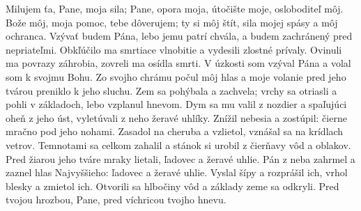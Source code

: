 Milujem ťa, Pane, moja sila;
Pane, opora moja, útočište moje, osloboditeľ môj.
\versseparator
Bože môj, moja pomoc, tebe dôverujem;
\versseparator
ty si môj štít, sila mojej spásy a môj ochranca.
\versseparator
Vzývať budem Pána, lebo jemu patrí chvála,
a budem zachránený pred nepriateľmi.
\versseparator
Obkľúčilo ma smrtiace vlnobitie
a vydesili zlostné prívaly.
\versseparator
Ovinuli ma povrazy záhrobia,
zovreli ma osídla smrti.
\versseparator
V úzkosti som vzýval Pána
a volal som k svojmu Bohu.
\versseparator
Zo svojho chrámu počul môj hlas
a moje volanie pred jeho tvárou preniklo k jeho sluchu.
\versseparator
Zem sa pohýbala a zachvela;
vrchy sa otriasli a pohli v základoch,
lebo vzplanul hnevom.
\versseparator
Dym sa mu valil z nozdier
a spaľujúci oheň z jeho úst,
vyletúvali z neho žeravé uhlíky.
\versseparator
Znížil nebesia a zostúpil:
čierne mračno pod jeho nohami.
\versseparator
Zasadol na cheruba a vzlietol,
vznášal sa na krídlach vetrov.
\versseparator
Temnotami sa celkom zahalil
a stánok si urobil
z čierňavy vôd a oblakov.
\versseparator
Pred žiarou jeho tváre mraky lietali,
ľadovec a žeravé uhlie.
\versseparator
Pán z neba zahrmel
a zaznel hlas Najvyššieho:
ľadovec a žeravé uhlie.
\versseparator
Vyslal šípy a rozprášil ich,
vrhol blesky a zmietol ich.
\versseparator
Otvorili sa hlbočiny vôd
a základy zeme sa odkryli.
\versseparator
Pred tvojou hrozbou, Pane,
pred víchricou tvojho hnevu.

